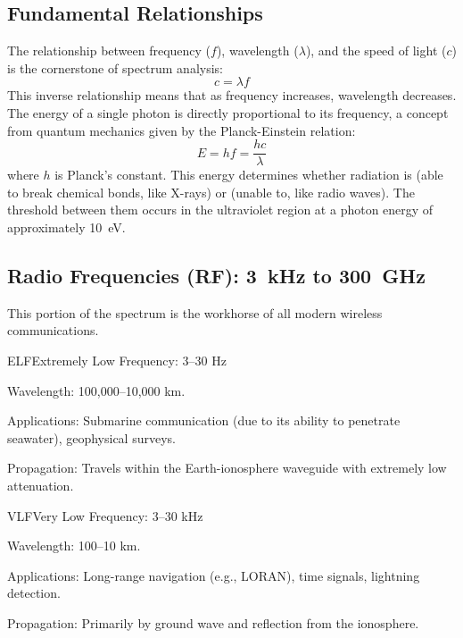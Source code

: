 \subsection{Fundamental Relationships}

The relationship between frequency ($f$), wavelength ($\lambda$), and the speed of light ($c$) is the cornerstone of spectrum analysis:
\begin{equation}
    c = \lambda f
    \label{eq:wavelength}
\end{equation}
This inverse relationship means that as frequency increases, wavelength decreases. The energy of a single photon is directly proportional to its frequency, a concept from quantum mechanics given by the Planck-Einstein relation:
\begin{equation}
    E = h f = \frac{hc}{\lambda}
\end{equation}
where $h$ is Planck's constant. This energy determines whether radiation is  (able to break chemical bonds, like X-rays) or  (unable to, like radio waves). The threshold between them occurs in the ultraviolet region at a photon energy of approximately 10~eV.

\subsection{Radio Frequencies (RF): \qty{3}{kHz} to \qty{300}{GHz}}

This portion of the spectrum is the workhorse of all modern wireless communications.

\begin{spectrumband}{ELF}{Extremely Low Frequency: 3--30 Hz}
    \item[Wavelength:] 100,000--10,000 km.
    \item[Applications:] Submarine communication (due to its ability to penetrate seawater), geophysical surveys.
    \item[Propagation:] Travels within the Earth-ionosphere waveguide with extremely low attenuation.
\end{spectrumband}

\begin{spectrumband}{VLF}{Very Low Frequency: 3--30 kHz}
    \item[Wavelength:] 100--10 km.
    \item[Applications:] Long-range navigation (e.g., LORAN), time signals, lightning detection.
    \item[Propagation:] Primarily by ground wave and reflection from the ionosphere.
\end{spectrumband}

